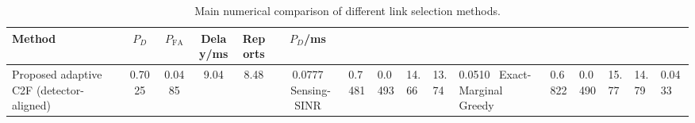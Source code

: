 \begin{table}[t]
    \centering
    \caption{Main numerical comparison of different link selection methods.}
    \label{tab:main_summary}
    \begin{tabular}{l c c c c c}
        \hline
        Method & $P_D$ & $P_{\mathrm{FA}}$ & Delay/ms & Reports & $P_D$/ms \\
        \hline
        Proposed adaptive C2F (detector-aligned) & 0.7025 & 0.0485 & 9.04 & 8.48 & 0.0777 \
        Sensing-SINR & 0.7481 & 0.0493 & 14.66 & 13.74 & 0.0510 \
        Exact-Marginal Greedy & 0.6822 & 0.0490 & 15.77 & 14.79 & 0.0433 \
        \hline
    \end{tabular}
\end{table}
